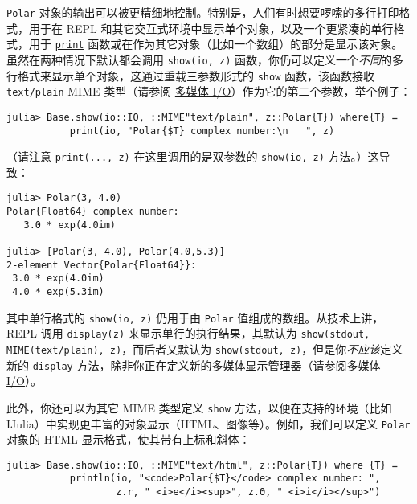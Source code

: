 \texttt{Polar} 对象的输出可以被更精细地控制。特别是，人们有时想要啰嗦的多行打印格式，用于在 REPL 和其它交互式环境中显示单个对象，以及一个更紧凑的单行格式，用于 \hyperlink{8248717042415202230}{\texttt{print}} 函数或在作为其它对象（比如一个数组）的部分是显示该对象。虽然在两种情况下默认都会调用 \texttt{show(io, z)} 函数，你仍可以定义一个\emph{不同}的多行格式来显示单个对象，这通过重载三参数形式的 \texttt{show} 函数，该函数接收 \texttt{text/plain} MIME 类型（请参阅 \hyperlink{9485638019478733873}{多媒体 I/O}）作为它的第二个参数，举个例子：




\begin{verbatim}
julia> Base.show(io::IO, ::MIME"text/plain", z::Polar{T}) where{T} =
           print(io, "Polar{$T} complex number:\n   ", z)
\end{verbatim}



（请注意 \texttt{print(..., z)} 在这里调用的是双参数的 \texttt{show(io, z)} 方法。）这导致：




\begin{verbatim}
julia> Polar(3, 4.0)
Polar{Float64} complex number:
   3.0 * exp(4.0im)

julia> [Polar(3, 4.0), Polar(4.0,5.3)]
2-element Vector{Polar{Float64}}:
 3.0 * exp(4.0im)
 4.0 * exp(5.3im)
\end{verbatim}



其中单行格式的 \texttt{show(io, z)} 仍用于由 \texttt{Polar} 值组成的数组。从技术上讲，REPL 调用 \texttt{display(z)} 来显示单行的执行结果，其默认为 \texttt{show(stdout, MIME({\textquotedbl}text/plain{\textquotedbl}), z)}，而后者又默认为 \texttt{show(stdout, z)}，但是你\emph{不应该}定义新的 \hyperlink{12073120410747960438}{\texttt{display}} 方法，除非你正在定义新的多媒体显示管理器（请参阅\hyperlink{9485638019478733873}{多媒体 I/O}）。



此外，你还可以为其它 MIME 类型定义 \texttt{show} 方法，以便在支持的环境（比如 IJulia）中实现更丰富的对象显示（HTML、图像等）。例如，我们可以定义 \texttt{Polar} 对象的 HTML 显示格式，使其带有上标和斜体：




\begin{verbatim}
julia> Base.show(io::IO, ::MIME"text/html", z::Polar{T}) where {T} =
           println(io, "<code>Polar{$T}</code> complex number: ",
                   z.r, " <i>e</i><sup>", z.Θ, " <i>i</i></sup>")
\end{verbatim}



